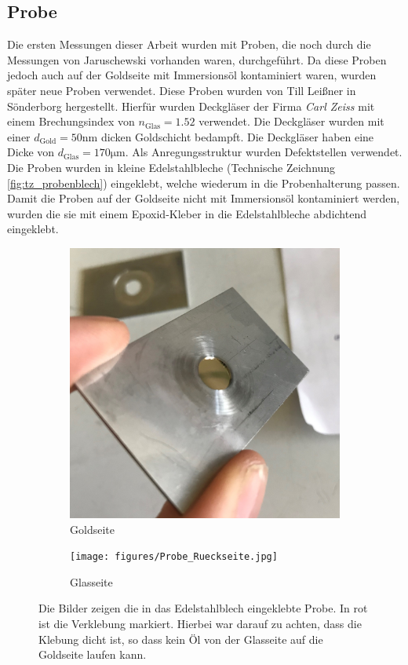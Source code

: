 \documentclass[titlepage]{article}
\begin{document}
	\subsection{Probe}
	Die ersten Messungen dieser Arbeit wurden mit Proben, die noch durch die Messungen von Jaruschewski \cite{Jaruschewski.2020} vorhanden waren, durchgeführt. Da diese Proben jedoch auch auf der Goldseite mit Immersionsöl kontaminiert waren, wurden später neue Proben verwendet. Diese Proben wurden von Till Leißner in Sönderborg hergestellt. Hierfür wurden Deckgläser der Firma \textit{Carl Zeiss} mit einem Brechungsindex von $n_{\mathrm{Glas}}= 1.52$ verwendet. Die Deckgläser wurden mit einer $d_{\mathrm{Gold}} = 50\mathrm{nm}$ dicken Goldschicht bedampft. Die Deckgläser haben eine Dicke von $d_{\mathrm{Glas}} = 170 \mathrm{\mu m}$. Als Anregungsstruktur wurden Defektstellen verwendet. Die Proben wurden in kleine Edelstahlbleche (Technische Zeichnung \ref{fig:tz_probenblech}) eingeklebt, welche wiederum in die Probenhalterung passen. Damit die Proben auf der Goldseite nicht mit Immersionsöl kontaminiert werden, wurden die sie mit einem Epoxid-Kleber in die Edelstahlbleche abdichtend eingeklebt.
	\begin{figure}
		\centering
		\begin{subfigure}[b]{0.4\textwidth}
			\centering
			\includegraphics[width=\textwidth]{figures/Probe_Vorderseite.jpg}
			\caption{Goldseite}
			\label{fig:probe_vorderseite}
		\end{subfigure}
		\hfill
		\begin{subfigure}[b]{0.4\textwidth}
			\centering
			\texttt{[image: figures/Probe\_Rueckseite.jpg]}
			\caption{Glasseite}
			\label{fig:probe_rueckseite}
		\end{subfigure}
		\caption[Eingeklebte Probe]{Die Bilder zeigen die in das Edelstahlblech eingeklebte Probe. In rot ist die Verklebung markiert. Hierbei war darauf zu achten, dass die Klebung dicht ist, so dass kein Öl von der Glasseite auf die Goldseite laufen kann.}
		\label{fig:probe}
	\end{figure}
\end{document}
